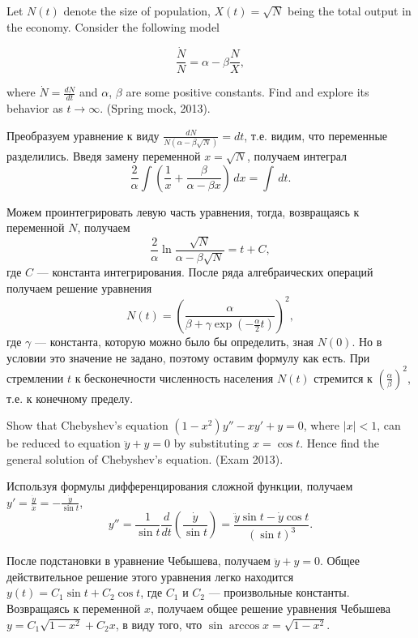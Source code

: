 \begin{problem}
Let $N(t)$ denote the size of population, $X(t)=\sqrt{N} $ being the total output in the economy. Consider the following model

\[\frac{\dot{N}}{N} =\alpha -\beta \frac{N}{X} ,\]

where $\dot{N}=\frac{dN}{dt} $ and $\alpha$, $\beta$ are some positive constants. Find  and explore its behavior as $t\to \infty $. (Spring mock, 2013).



\begin{sol}
Преобразуем уравнение к виду $\frac{dN}{N(\alpha -\beta \sqrt{N} )} =dt$, т.е. видим, что переменные разделились. Введя замену переменной $x=\sqrt{N} $, получаем интеграл
\[
\frac{2}{\alpha} \int \left( \frac{1}{x} + \frac{\beta}{\alpha - \beta x} \right) \, dx = \int \, dt.
\]

Можем проинтегрировать левую часть уравнения, тогда, возвращаясь к переменной $N$, получаем
\[
\frac{2}{\alpha } \ln \frac{\sqrt{N} }{\alpha -\beta \sqrt{N} } =t+C,
\]
где $C$ --- константа интегрирования. После ряда алгебраических операций получаем решение уравнения
\[
N(t)=\left(\frac{\alpha }{\beta +\gamma \exp (-\frac{\alpha }{2} t)} \right)^{2},
\]
где $\gamma$ --- константа, которую можно было бы определить, зная $N(0)$. Но в условии это значение не задано, поэтому оставим формулу как есть. При стремлении $t$ к бесконечности численность населения $N(t)$ стремится к $\left(\frac{\alpha }{\beta } \right)^{2} $, т.е. к конечному пределу.
\end{sol}
\end{problem}


\begin{problem}
Show that Chebyshev's equation $(1-x^{2} )y''-xy'+y=0$, where $\left|x\right|<1$, can be reduced to equation $\ddot{y}+y=0$ by substituting $x=\cos t$. Hence find the general solution of  Chebyshev's equation. (Exam 2013).


\begin{sol}
Используя формулы дифференцирования сложной функции, получаем  $y'=\frac{\dot{y}}{\dot{x}}=-\frac{\dot{y}}{\sin t}$,
\[
y''=\frac{1}{\sin t} \frac{d}{dt} \left( \frac{\dot{y}}{\sin t}  \right)=\frac{\ddot{y} \sin t - \dot{y} \cos t }{(\sin t)^3}.
\]

После подстановки в уравнение Чебышева, получаем  $\ddot{y}+y=0$. Общее действительное решение этого уравнения легко находится $y(t)=C_1 \sin t + C_2 \cos t$, где  $C_1$ и  $C_2$ --- произвольные константы. Возвращаясь к переменной $x$, получаем общее решение уравнения Чебышева $y=C_1 \sqrt{1-x^2} + C_2 x$, в виду того, что $\sin \arccos x=\sqrt{1-x^2}$.
\end{sol}
\end{problem}


